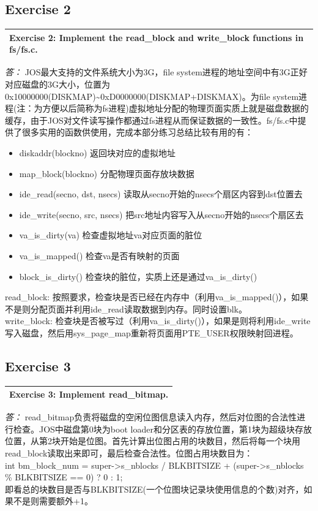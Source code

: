 \documentclass[11pt,a4paper]{article}
\newcommand{\exercise}[2]{
\begin{tabular}{|p{\textwidth}|}
\hline
#1: #2\\
\hline
\end{tabular}
\textit{\large{答：}}}
\begin{document}
\subsection{Exercise 2}
\exercise{Exercise 2}{Implement the read\_block and write\_block functions in fs/fs.c.}
JOS最大支持的文件系统大小为3G，file system进程的地址空间中有3G正好对应磁盘的3G大小，位置为0x10000000(DISKMAP)\~{}0xD0000000(DISKMAP+DISKMAX)。为file system进程(注：为方便以后简称为fs进程)虚拟地址分配的物理页面实质上就是磁盘数据的缓存，由于JOS对文件读写操作都通过fs进程从而保证数据的一致性。fs/fs.c中提供了很多实用的函数供使用，完成本部分练习总结比较有用的有：\\
\begin{itemize}
\item diskaddr(blockno) 返回块对应的虚拟地址
\item map\_block(blockno) 分配物理页面存放块数据
\item ide\_read(secno, dst, nsecs) 读取从secno开始的nsecs个扇区内容到dst位置去
\item ide\_write(secno, src, nsecs) 把src地址内容写入从secno开始的nsecs个扇区去
\item va\_is\_dirty(va) 检查虚拟地址va对应页面的脏位
\item va\_is\_mapped() 检查va是否有映射的页面
\item block\_is\_dirty() 检查块的脏位，实质上还是通过va\_is\_dirty()
\end{itemize}
read\_block: 按照要求，检查块是否已经在内存中（利用va\_is\_mapped()），如果不是则分配页面并利用ide\_read读取数据到内存。同时设置blk。\\
write\_block: 检查块是否被写过（利用va\_is\_dirty()），如果是则将利用ide\_write写入磁盘，然后用sys\_page\_map重新将页面用PTE\_USER权限映射回进程。\\

\subsection{Exercise 3}
\exercise{Exercise 3}{Implement read\_bitmap.}
read\_bitmap负责将磁盘的空闲位图信息读入内存，然后对位图的合法性进行检查。JOS中磁盘第0块为boot loader和分区表的存放位置，第1块为超级块存放位置，从第2块开始是位图。首先计算出位图占用的块数目，然后将每一个块用read\_block读取出来即可，最后检查合法性。位图占用块数目为：\\
int bm\_block\_num = super->s\_nblocks / BLKBITSIZE + (super->s\_nblocks \% BLKBITSIZE == 0) ? 0 : 1;\\
即看总的块数目是否与BLKBITSIZE(一个位图块记录块使用信息的个数)对齐，如果不是则需要额外+1。\\
\end{document}
